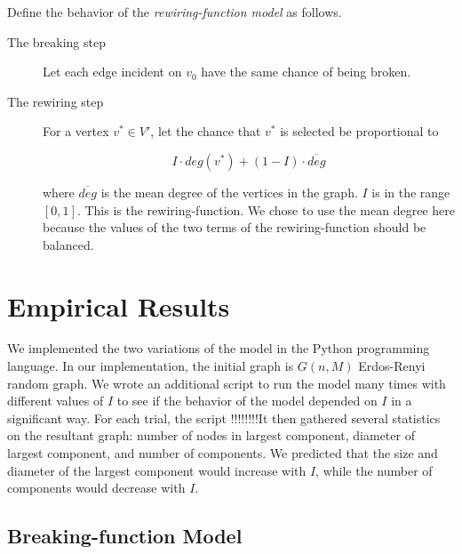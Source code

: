 \documentclass[a4paper,10pt]{article}
\begin{document}
Define the behavior of the \emph{rewiring-function model} as follows.

\begin{description}
 \item[The breaking step] Let each edge incident on $v_0$ have the same chance of being broken.

 \item[The rewiring step] For a vertex $v^* \in V'$, let the chance that $v^*$ is selected be proportional to

 \begin{equation}
\label{eqn:rewiring-function}
  I \cdot deg(v^*) + (1 - I) \cdot \overline{deg}
 \end{equation}

where $\overline{deg}$ is the mean degree of the vertices in the graph. $I$ is in the range $[0, 1]$. This is the rewiring-function. We chose to use the mean degree here because the values of the two terms of the rewiring-function should be balanced. 

\end{description}

\section{Empirical Results}

We implemented the two variations of the model in the Python programming language. In our implementation, the initial graph is $G(n, M)$ Erdos-Renyi random graph. We wrote an additional script to run the model many times with different values of $I$ to see if the behavior of the model depended on $I$ in a significant way. For each trial, the script !!!!!!!!It then gathered several statistics on the resultant graph: number of nodes in largest component, diameter of largest component, and number of components. We predicted that the size and diameter of the largest component would increase with $I$, while the number of components would decrease with $I$. 

\subsection{Breaking-function Model}
\end{document}
